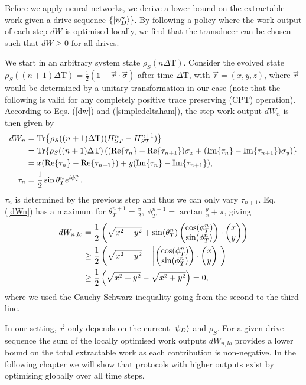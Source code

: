 Before we apply neural networks, we derive a lower bound on the extractable work given a drive sequence $\{\ket{\psi_D^n}\}$.
By following a policy where the work output of each step $dW$ is optimised locally, we find that the transducer can be chosen such that $dW \geq 0$ for all drives.

We start in an arbitrary system state $\rho_S(n \Delta \mathrm{T})$.
Consider the evolved state $\rho_S((n+1) \Delta \mathrm{T}) =\frac{1}{2} (\mathds{1} + \vec{r} \cdot \vec{\sigma})$ after time $\Delta \mathrm{T}$, with $\vec{r} = ( x, y, z )$, where $\vec{r}$ would be determined by a unitary transformation in our case (note that the following is valid for any completely positive trace preserving (CPT) operation). According to Eqs. (\ref{dw}) and (\ref{simpledeltaham}), the step work output $dW_n$ is then given by
\begin{align} \label{dWn}
dW_n &= \Tr{\rho_S((n+1) \Delta \mathrm{T}) (H_{ST}^{n} - H_{ST}^{n+1})} \nonumber \\
&= \Tr{\rho_S((n+1) \Delta \mathrm{T}) \left((\Re{\tau_n} - \Re{\tau_{n+1}}) \sigma_x + (\Im{\tau_n} - \Im{\tau_{n+1}} ) \sigma_y \right)} \nonumber \\
&= x (\Re{\tau_n} - \Re{\tau_{n+1}}) + y (\Im{\tau_n} - \Im{\tau_{n+1}}), \\
\tau_n &= \frac{1}{2} \sin{\theta_T^n} e^{i\phi_T^n}. \nonumber
\end{align}
$\tau_n$ is determined by the previous step and thus we can only vary $\tau_{n+1}$.
Eq. (\ref{dWn}) has a maximum for $\theta_T^{n+1} = \frac{\pi}{2}, \ \phi_T^{n+1} = \arctan{\frac{y}{x}} + \pi$, giving
\begin{align*}
dW_{n, lo} &= \frac{1}{2}\left(\sqrt{x^2 + y^2} + \sin(\theta^n_T) \begin{pmatrix} \cos(\phi^n_T) \\ \sin(\phi^n_T) \end{pmatrix} \cdot \begin{pmatrix} x \\ y \end{pmatrix} \right) \\
 &\geq \frac{1}{2}\left(\sqrt{x^2 + y^2} - \abs{ \begin{pmatrix} \cos(\phi^n_T) \\ \sin(\phi^n_T) \end{pmatrix} \cdot \begin{pmatrix} x \\ y \end{pmatrix}} \right) \\
 &\geq \frac{1}{2}\left(\sqrt{x^2 + y^2} - \sqrt{x^2 + y^2} \right) = 0,
\end{align*}
where we used the Cauchy-Schwarz inequality going from the second to the third line.

In our setting, $\vec{r}$ only depends on the current $\ket{\psi_D}$ and $\rho_S$.
For a given drive sequence the sum of the locally optimised work outputs $dW_{n, lo}$ provides a lower bound on the total extractable work as each contribution is non-negative. In the following chapter we will show that protocols with higher outputs exist by optimising globally over all time steps.